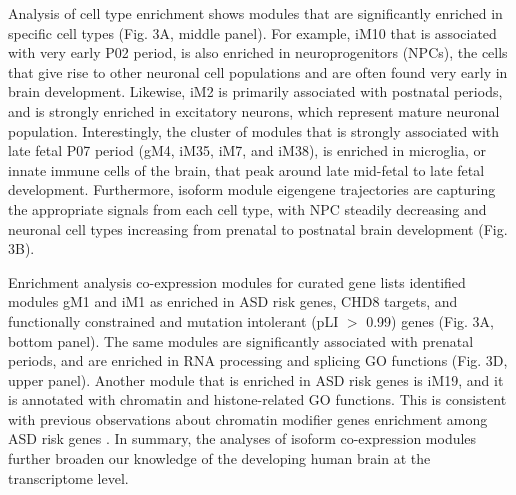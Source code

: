 \documentclass[12pt,chapterheads,final]{ucsd}
\begin{document}
Analysis of cell type enrichment shows modules that are significantly enriched in specific cell types (Fig. 3A, middle panel). For example, iM10 that is associated with very early P02 period, is also enriched in neuroprogenitors (NPCs), the cells that give rise to other neuronal cell populations and are often found very early in brain development. Likewise, iM2 is primarily associated with postnatal periods, and is strongly enriched in excitatory neurons, which represent mature neuronal population. Interestingly, the cluster of modules that is strongly associated with late fetal P07 period (gM4, iM35, iM7, and iM38), is enriched in microglia, or innate immune cells of the brain, that peak around late mid-fetal to late fetal development. Furthermore, isoform module eigengene trajectories are capturing the appropriate signals from each cell type, with NPC steadily decreasing and neuronal cell types increasing from prenatal to postnatal brain development (Fig. 3B). \par
Enrichment analysis co-expression modules for curated gene lists identified modules gM1 and iM1 as enriched in ASD risk genes, CHD8 targets, and functionally constrained and mutation intolerant (pLI $>$ 0.99) genes (Fig. 3A, bottom panel). The same modules are significantly associated with prenatal periods, and are enriched in RNA processing and splicing GO functions (Fig. 3D, upper panel). Another module that is enriched in ASD risk genes is iM19, and it is annotated with chromatin and histone-related GO functions. This is consistent with previous observations about chromatin modifier genes enrichment among ASD risk genes \cite{DeRubeis2014}. In summary, the analyses of isoform co-expression modules further broaden our knowledge of the developing human brain at the transcriptome level.  \par
\end{document}
